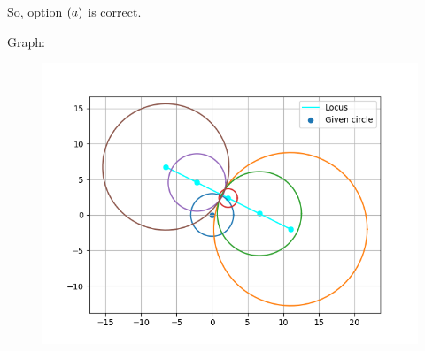 \documentclass{beamer}
\numberwithin{equation}{section}
\begin{document}
So, option \textbf{$\left(a\right)$} is correct.


Graph:
\begin{figure}[h!]
	\centering
	\includegraphics[width=0.7\linewidth]{img2.png}
\end{figure}
\end{document}
